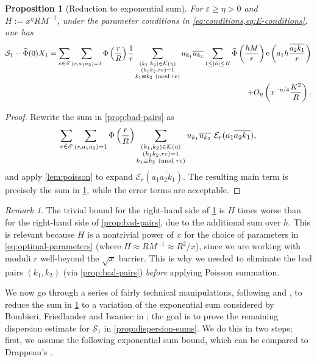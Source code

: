 \documentclass[reqno,11pt]{amsart}
\newtheorem{proposition}[theorem]{Proposition}
\theoremstyle{definition}
\theoremstyle{remark}
\newtheorem*{remark}{Remark}
\numberwithin{equation}{section}
\newcommand{\msE}{\mathscr{E}}
\newcommand{\mE}{\mathcal{E}}
\newcommand{\mS}{\mathcal{S}}
\newcommand{\mK}{\mathcal{K}}
\newcommand{\e}{\textnormal{e}}
\newcommand{\eps}{\varepsilon}
\renewcommand{\bar}{\overline}
\renewcommand{\hat}{\widehat}
\renewcommand{\pmod}[1]{\ (\textnormal{mod } #1)}
\begin{document}
\begin{proposition}[Reduction to exponential sum] \label{prop:simplification}
For $\eps \ge \eta > 0$ and $H := x^\eta R M^{-1}$, under the parameter conditions in \cref{eq:conditions,eq:E-conditions}, one has
\[
\begin{aligned}
    \mS_1 - \hat{\Phi}(0) X_1 
    =
    \sum_{e \in \msE} \sum_{(r, a_1a_2) = 1} \Phi\left(\frac{r}{R}\right) \frac{1}{r}
    \sum_{\substack{(k_1, k_2) \in \mK(\eta) \\ (k_1 k_2, re) = 1 \\ k_1 \equiv k_2 \pmod{re}}} u_{k_1} \bar{u_{k_2}} 
    \sum_{1 \le |h| \le H} \hat{\Phi}\left(\frac{hM}{r}\right) \e\left(a_1 h \frac{\bar{a_2k_1}}{r} \right)
    \\
    + O_\eta\left(x^{-\eta/4} \frac{K^2}{R} \right).
\end{aligned}
\]
\end{proposition}
\begin{proof}
Rewrite the sum in \cref{prop:bad-pairs} as
\[
    \sum_{e \in \msE} \sum_{(r,a_1a_2)=1} \Phi\left(\frac{r}{R}\right) \sum_{\substack{(k_1, k_2) \in \mK(\eta) \\ (k_1k_2, re) = 1 \\ k_1 \equiv k_2 \pmod{re}}} u_{k_1} \bar{u_{k_2}}\ \mE_r(a_1 \bar{a_2 k_1}),
\]
and apply \cref{lem:poisson} to expand $\mE_r(a_1 \bar{a_2 k_1})$. The resulting main term is precisely the sum in \cref{prop:simplification}, while the error terms are acceptable.
\end{proof}

\begin{remark}
The trivial bound for the right-hand side of \cref{prop:simplification} is $H$ times worse than for the right-hand side of \cref{prop:bad-pairs}, due to the additional sum over $h$. This is relevant because $H$ is a nontrivial power of $x$ for the choice of parameters in \cref{eq:optimal-parameters} (where $H \approx R M^{-1} \approx R^2/x$), since we are working with moduli $r$ well-beyond the $\sqrt{x}$ barrier. This is why we needed to eliminate the bad pairs $(k_1, k_2)$ (via \cref{prop:bad-pairs}) \emph{before} applying Poisson summation.
\end{remark}

We now go through a series of fairly technical manipulations, following \cite{drappeau2015theoremes} and \cite{maynard2020primes}, to reduce the sum in \cref{prop:simplification} to a variation of the exponential sum considered by Bombieri, Friedlander and Iwaniec in \cite[\S 10]{bombieri1987primes2}; the goal is to prove the remaining dispersion estimate for $\mS_1$ in \cref{prop:dispersion-sums}. We do this in two steps; first, we assume the following exponential sum bound, which can be compared to Drappeau's \cite[Proposition 1]{drappeau2015theoremes}.
\end{document}
